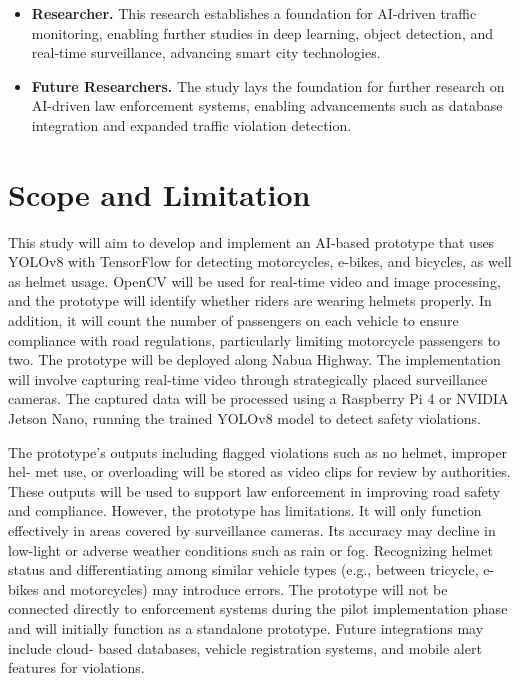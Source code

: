 \begin{refsection}
\begin{itemize}
    \item \textbf{Researcher.} This research establishes a foundation for AI-driven traffic monitoring, enabling further studies in deep learning, object detection, and real-time surveillance, advancing smart city technologies.
    
    \item \textbf{Future Researchers.} The study lays the foundation for further research on AI-driven law enforcement systems, enabling advancements such as database integration and expanded traffic violation detection.
\end{itemize}

\section{Scope and Limitation}

This study will aim to develop and implement an AI-based prototype that uses YOLOv8 with TensorFlow for detecting motorcycles, e-bikes, and bicycles, as well as helmet usage. OpenCV will be used for real-time video and image processing, and the prototype will identify whether riders are wearing helmets properly. In addition, it will count the number of passengers on each vehicle to ensure compliance with road regulations, particularly limiting motorcycle passengers to two. The prototype will be deployed along Nabua Highway. The implementation will involve capturing real-time video through strategically placed surveillance cameras. The captured data will be processed using a Raspberry Pi 4 or NVIDIA Jetson Nano, running the trained YOLOv8 model to detect safety violations.

The prototype’s outputs including flagged violations such as no helmet, improper hel- met use, or overloading will be stored as video clips for review by authorities. These outputs will be used to support law enforcement in improving road safety and compliance. However, the prototype has limitations. It will only function effectively in areas covered by surveillance cameras. Its accuracy may decline in low-light or adverse weather conditions such as rain or fog. Recognizing helmet status and differentiating among similar vehicle types (e.g., between tricycle, e-bikes and motorcycles) may introduce errors. The prototype will not be connected directly to enforcement systems during the pilot implementation phase and will initially function as a standalone prototype. Future integrations may include cloud- based databases, vehicle registration systems, and mobile alert features for violations.



\end{refsection}
